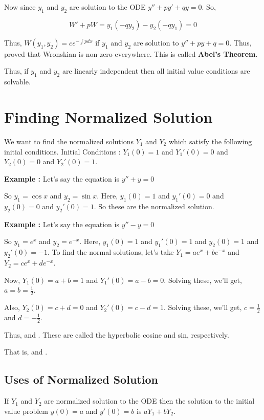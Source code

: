 Now since $y_1$ and $y_2$ are solution to the ODE $y'' + py' + qy = 0$.
So, 

$$
W' + pW = y_1( - q y_2 ) - y_2( - q y_1 ) = 0
$$ 

Thus, $W(y_1, y_2) = c e^{- \int p dx}$ if $y_1$ and $y_2$ are solution to $y'' + py  + q = 0$.
Thus, proved that Wronskian is non-zero everywhere.
This is called {\bf Abel's Theorem}.

Thus, if $y_1$ and $y_2$ are linearly independent then all initial value conditions are solvable.


\section{Finding Normalized Solution}

We want to find the normalized solutions $Y_1$ and $Y_2$ which satisfy the following initial conditions.
Initial Conditions : $Y_1(0) = 1$ and $Y_1'(0) = 0$ and $Y_2(0) = 0$ and $Y_2'(0) = 1$.

{\bf Example : } Let's say the equation is $y'' + y = 0$

So $y_1 = \cos x$ and $y_2 = \sin x$.
Here, $y_1(0) = 1$ and $y_1'(0) = 0$ and $y_2(0) = 0$ and $y_2'(0) = 1$.
So these are the normalized solution.

{\bf Example : } Let's say the equation is $y'' - y = 0$

So $y_1 = e^x$ and $y_2 = e^{-x}$.
Here, $y_1(0) = 1$ and $y_1'(0) = 1$ and $y_2(0) = 1$ and $y_2'(0) = -1$.
To find the normal solutions, let's take $Y_1 = ae^x + be^{-x}$ and $Y_2 = ce^x + de^{-x}$.

Now, $Y_1(0) = a + b = 1 $ and $Y_1'(0) = a - b = 0$.
Solving these, we'll get, $a = b = \frac{1}{2}$.

Also, $Y_2(0) = c + d = 0$ and $Y_2'(0) = c - d = 1$.
Solving these, we'll get, $c = \frac{1}{2}$ and $d = -\frac{1}{2}$.

Thus,  and .
These are called the hyperbolic cosine and sin, respectively.

That is,  and .


\subsection{Uses of Normalized Solution}

If $Y_1$ and $Y_2$ are normalized solution to the ODE then the solution 
to the initial value problem $y(0) = a$ and $y'(0) = b$ is $a Y_1 + b Y_2$.


